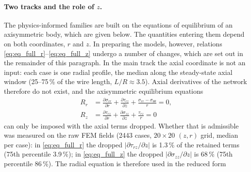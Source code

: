 \documentclass[subscriptcorrection,upint,varvw,barcolor=Goldenrod3,mathalfa=cal=euler,balance,hyphenate,french,pdf-a]{asmejour} %
\begin{document}
\paragraph{Two tracks and the role of $z$.}
The physics-informed families are built on the equations of equilibrium of an
axisymmetric body, which are given below. The quantities entering them depend
on both coordinates, $r$ and $z$. In preparing the models, however, relations
\eqref{eq:eq_full_r}--\eqref{eq:eq_full_z} undergo a number of changes, which
are set out in the remainder of this paragraph.
In the main track the axial coordinate is not an input: each case is one radial
profile, the median along the steady-state axial window (25--75\,\% of the wire
length, $L/R\approx3.5$).
Axial derivatives of the network therefore do not exist, and the axisymmetric
equilibrium equations
\begin{align}
  R_r &= \frac{\partial\sigma_{rr}}{\partial r}
        + \frac{\partial\tau_{rz}}{\partial z}
        + \frac{\sigma_{rr}-\sigma_{\theta\theta}}{r} = 0, \label{eq:eq_full_r}\\
  R_z &= \frac{\partial\tau_{rz}}{\partial r}
        + \frac{\partial\sigma_{zz}}{\partial z}
        + \frac{\tau_{rz}}{r} = 0 \label{eq:eq_full_z}
\end{align}
can only be imposed with the axial terms dropped. Whether that is admissible was
measured on the raw FEM fields (2443 cases, $20\times20$ $(z,r)$ grid, median per
case): in \eqref{eq:eq_full_r} the dropped $|\partial\tau_{rz}/\partial z|$ is
1.3\,\% of the retained terms (75th percentile 3.9\,\%); in \eqref{eq:eq_full_z}
the dropped $|\partial\sigma_{zz}/\partial z|$ is 68\,\% (75th percentile 86\,\%).
The radial equation is therefore used in the reduced form
\end{document}
